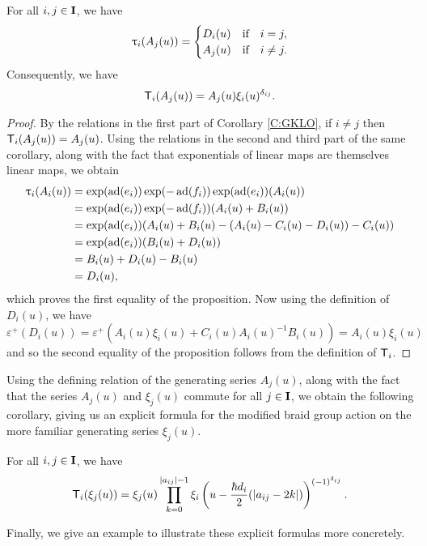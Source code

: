 \begin{proposition}\label{P:tau-a}
    For all $i,j\in\mathbf{I}$, we have
    \[\uptau_i(A_j(u)) =
    \begin{cases}
        D_i(u) & \text{if}\quad i=j, \\
        A_j(u) & \text{if}\quad i\neq j.
    \end{cases}\]
    Consequently, we have
    \[\mathsf{T}_i(A_j(u)) = A_j(u)\xi_i(u)^{\delta_{ij}}.\]
\end{proposition}
\begin{proof}
    By the relations in the first part of Corollary \ref{C:GKLO}, if $i\neq j$ then $\mathsf{T}_i(A_j(u)) = A_j(u)$.
    Using the relations in the second and third part of the same corollary, along with the fact that exponentials of linear maps are themselves linear maps, we obtain
    \begin{align*}
        \uptau_i(A_i(u)) &= \exp(\operatorname{ad}(e_i))\exp(-\operatorname{ad}(f_i))\exp(\operatorname{ad}(e_i))(A_i(u)) \\
        &= \exp(\operatorname{ad}(e_i))\exp(-\operatorname{ad}(f_i))(A_i(u) + B_i(u)) \\
        &= \exp(\operatorname{ad}(e_i))(A_i(u) + B_i(u) - (A_i(u) - C_i(u) - D_i(u)) - C_i(u)) \\
        &= \exp(\operatorname{ad}(e_i))(B_i(u) + D_i(u)) \\
        &= B_i(u) + D_i(u) - B_i(u) \\
        &= D_i(u),
    \end{align*}
    which proves the first equality of the proposition.
    Now using the definition of $D_i(u)$, we have
    \[\varepsilon^+(D_i(u)) = \varepsilon^+(A_i(u)\xi_i(u) + C_i(u)A_i(u)^{-1}B_i(u)) = A_i(u)\xi_i(u)\]
    and so the second equality of the proposition follows from the definition of $\mathsf{T}_i$.
\end{proof}

Using the defining relation of the generating series $A_j(u)$, along with the fact that the series $A_j(u)$ and $\xi_j(u)$ commute for all $j\in\mathbf{I}$, we obtain the following corollary, giving us an explicit formula for the modified braid group action on the more familiar generating series $\xi_j(u)$.

\begin{corollary}\label{C:tau-xi}
    For all $i,j\in\mathbf{I}$, we have
    \[\mathsf{T}_i(\xi_j(u)) = \xi_j(u)\prod_{k=0}^{\lvert a_{ij}\rvert-1} \xi_i\left(u-\frac{\hbar d_i}{2}(\lvert a_{ij}-2k\rvert)\right)^{(-1)^{\delta_{ij}}}.\]
\end{corollary}

Finally, we give an example to illustrate these explicit formulas more concretely.

